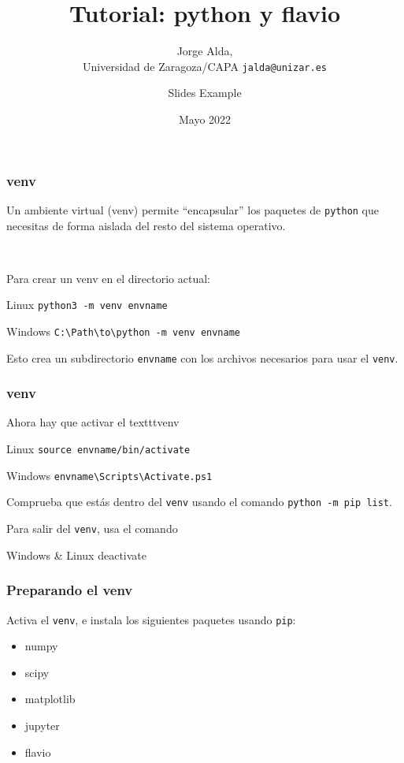 \documentclass[mathserif, 10pt]{beamer}
\title{Tutorial: python y flavio}
\subtitle{Jorge Alda,\\ Universidad de Zaragoza/CAPA\hspace{4em} \texttt{jalda@unizar.es} }
\author[Jorge Alda]{Slides Example}
\date{Mayo 2022}
\begin{document}
\begin{frame}

    \titlepage

\end{frame}


\begin{frame}\frametitle{venv}
    Un ambiente virtual (venv) permite ``encapsular'' los paquetes de \texttt{python} que necesitas de forma aislada del resto del sistema operativo.

    ~

    Para crear un venv en el directorio actual:
    \begin{block}{Linux}
        \texttt{python3 -m venv envname}
    \end{block}
    \begin{block}{Windows}
        \texttt{C:\textbackslash Path\textbackslash to\textbackslash python -m venv envname}
    \end{block}

    Esto crea un subdirectorio \texttt{envname} con los archivos necesarios para usar el \texttt{venv}.
\end{frame}

\begin{frame}\frametitle{venv}

    Ahora hay que activar el texttt{venv}
    \begin{block}{Linux}
        \texttt{source envname/bin/activate}
    \end{block}
    \begin{block}{Windows}
        \texttt{envname\textbackslash Scripts\textbackslash Activate.ps1}
    \end{block}

    Comprueba que estás dentro del \texttt{venv} usando el comando \texttt{python -m pip list}.

    Para salir del \texttt{venv}, usa el comando
    \begin{block}{Windows \& Linux}
        deactivate
    \end{block}
\end{frame}

\begin{frame}\frametitle{Preparando el venv}
    Activa el \texttt{venv}, e instala los siguientes paquetes usando \texttt{pip}:
    \begin{itemize}
        \item numpy
        \item scipy
        \item matplotlib
\item jupyter
        \item flavio
    \end{itemize}
\end{frame}
\end{document}
